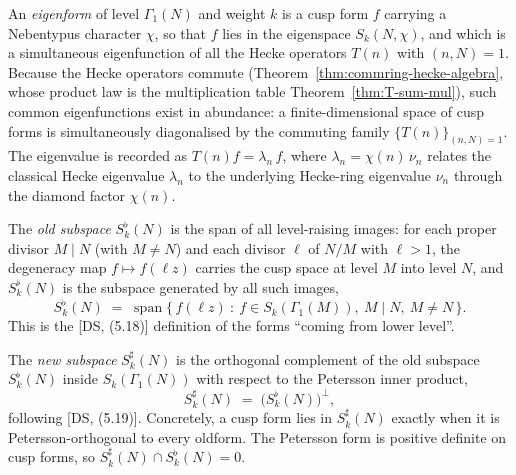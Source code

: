 \begin{definition}[Eigenform]\label{def:eigenform}
\leanok
An \emph{eigenform} of level $\Gamma_1(N)$ and weight $k$ is a cusp form $f$ carrying a Nebentypus
character $\chi$, so that $f$ lies in the eigenspace $S_k(N,\chi)$, and which is a simultaneous
eigenfunction of all the Hecke operators $T(n)$ with $(n,N)=1$. Because the Hecke operators commute
(Theorem~\ref{thm:commring-hecke-algebra}, whose product law is the multiplication table
Theorem~\ref{thm:T-sum-mul}), such common eigenfunctions exist in abundance: a finite-dimensional space
of cusp forms is simultaneously diagonalised by the commuting family $\{T(n)\}_{(n,N)=1}$. The eigenvalue
is recorded as $T(n)f=\lambda_n\,f$, where $\lambda_n=\chi(n)\,\nu_n$ relates the classical Hecke
eigenvalue $\lambda_n$ to the underlying Hecke-ring eigenvalue $\nu_n$ through the diamond factor $\chi(n)$.
\end{definition}

\begin{definition}\label{def:cuspFormsOld}
\leanok
The \emph{old subspace} $S_k^{\flat}(N)$ is the span of all level-raising images: for each proper divisor
$M\mid N$ (with $M\neq N$) and each divisor $\ell$ of $N/M$ with $\ell>1$, the degeneracy map
$f\mapsto f(\ell z)$ carries the cusp space at level $M$ into level $N$, and $S_k^{\flat}(N)$ is the
subspace generated by all such images,
\[
  S_k^{\flat}(N) \;=\; \operatorname{span}\bigl\{\, f(\ell z) \ :\ f\in S_k(\Gamma_1(M)),\ M\mid N,\ M\neq N \,\bigr\}.
\]
This is the [DS, (5.18)] definition of the forms ``coming from lower level''.
\end{definition}

\begin{definition}\label{def:cuspFormsNew}
\leanok
The \emph{new subspace} $S_k^{\sharp}(N)$ is the orthogonal complement of the old subspace
$S_k^{\flat}(N)$ inside $S_k(\Gamma_1(N))$ with respect to the Petersson inner product,
\[
  S_k^{\sharp}(N) \;=\; \bigl(S_k^{\flat}(N)\bigr)^{\perp},
\]
following [DS, (5.19)]. Concretely, a cusp form lies in $S_k^{\sharp}(N)$ exactly when it is Petersson-orthogonal
to every oldform. The Petersson form is positive definite on cusp forms, so $S_k^{\sharp}(N)\cap S_k^{\flat}(N)=0$.
\end{definition}

